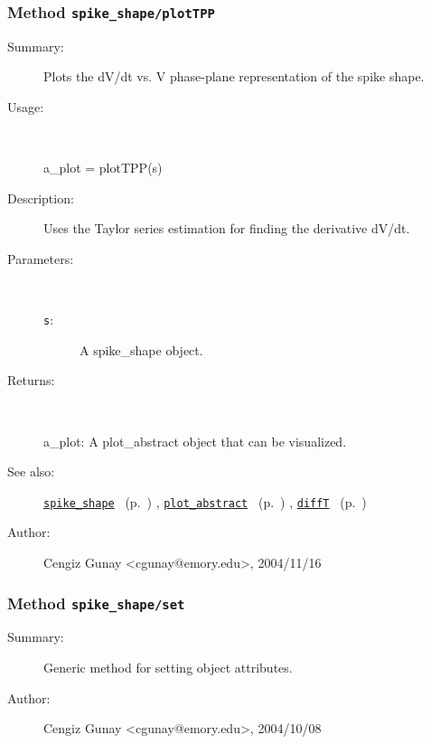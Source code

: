 \subsubsection[Method \texttt{plotTPP}]{Method \texttt{spike\_shape/plotTPP}}%
%
\label{ref_spike_shape__plotTPP}%
\hypertarget{ref_spike_shape__plotTPP}{}%
\begin{description}
\item[Summary:]Plots the dV/dt vs. V phase-plane representation of the spike shape.
%
\item[Usage:]~%
\begin{lyxcode}%
a\_plot = plotTPP(s)
%
\end{lyxcode}%
%
\item[Description:]%
Uses the Taylor series estimation for finding the derivative dV/dt.
\item[Parameters:]~
\begin{description}%
\item[\texttt{s}:]
 A spike\_shape object.
\end{description}%
%
\item[Returns:
]~

	a\_plot: A plot\_abstract object that can be visualized.
%
%
\item[See also:]%
\hyperlink{ref_spike_shape}{\texttt{spike\_shape}}%
\ (p.~\pageref{ref_spike_shape})%
%
, \hyperlink{ref_plot_abstract}{\texttt{plot\_abstract}}%
\ (p.~\pageref{ref_plot_abstract})%
%
, \hyperlink{ref_diffT}{\texttt{diffT}}%
\ (p.~\pageref{ref_diffT})%
%
%
\item[Author:]%
Cengiz Gunay <cgunay@emory.edu>, 2004/11/16
%
\end{description}
\methodline%
\subsubsection[Method \texttt{set}]{Method \texttt{spike\_shape/set}}%
%
\label{ref_spike_shape__set}%
\hypertarget{ref_spike_shape__set}{}%
\begin{description}
\item[Summary:]Generic method for setting object attributes.
%
%
%
%
%
%
%
\item[Author:]%
Cengiz Gunay <cgunay@emory.edu>, 2004/10/08
%
\end{description}
\methodline%
